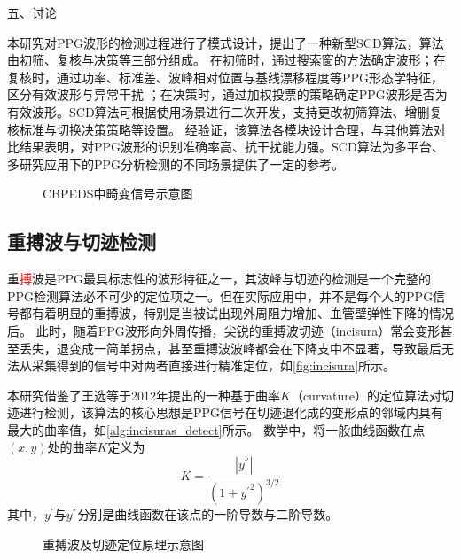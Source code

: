 五、讨论

本研究对PPG波形的检测过程进行了模式设计，提出了一种新型SCD算法，算法由初筛、复核与决策等三部分组成。
在初筛时，通过搜索窗的方法确定波形；在复核时，通过功率、标准差、波峰相对位置与基线漂移程度等PPG形态学特征，区分有效波形与异常干扰
；在决策时，通过加权投票的策略确定PPG波形是否为有效波形。SCD算法可根据使用场景进行二次开发，支持更改初筛算法、增删复核标准与切换决策策略等设置。
经验证，该算法各模块设计合理，与其他算法对比结果表明，对PPG波形的识别准确率高、抗干扰能力强。SCD算法为多平台、多研究应用下的PPG分析检测的不同场景提供了一定的参考。

\begin{figure}[h]
    \centering
    \quad
    \quad
    \caption{\label{fig:ucibp_abnormal}CBPEDS中畸变信号示意图}
\end{figure}

\subsection{重搏波与切迹检测}
重\textcolor{red}{搏}波是PPG最具标志性的波形特征之一，其波峰与切迹的检测是一个完整的PPG检测算法必不可少的定位项之一\cite{Wang2012}。但在实际应用中，并不是每个人的PPG信号都有着明显的重搏波，特别是当被试出现外周阻力增加、血管壁弹性下降的情况后\cite{mmt}。
此时，随着PPG波形向外周传播，尖锐的重搏波切迹（incisura）常会变形甚至丢失，退变成一简单拐点，甚至重搏波波峰都会在下降支中不显著，导致最后无法从采集得到的信号中对两者直接进行精准定位，如\autoref{fig:incisura}所示。

本研究借鉴了王选等\cite{Wang2012}于2012年提出的一种基于曲率$K$（curvature）的定位算法对切迹进行检测，该算法的核心思想是PPG信号在切迹退化成的变形点的邻域内具有最大的曲率值，如\autoref{alg:incisuras_detect}所示。
数学中，将一般曲线函数在点$(x,y)$处的曲率$K$定义为
\begin{equation}
    \label{equ:curvature}
    K=\frac{|y^{''}|}{{(1+{y^{'}}^2)}^{3/2}}
\end{equation}
其中，$y^{'}$与$y^{''}$分别是曲线函数在该点的一阶导数与二阶导数。

\begin{figure}[htbp]
    \centering
    \quad
    \caption[重搏波及切迹定位原理示意图]{\label{fig:incisura}重搏波及切迹定位原理示意图\cite{Wang2012,Su2014}}
\end{figure}

